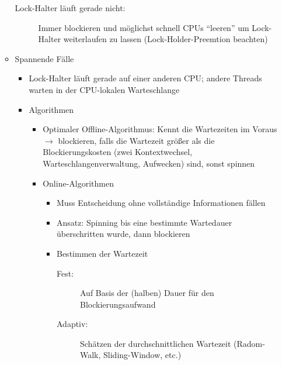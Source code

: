 \begin{itemize}
\begin{itemize}
\begin{description}
			\item[Lock-Halter läuft gerade nicht:] Immer blockieren und möglichst schnell CPUs "`leeren"' um Lock-Halter weiterlaufen zu lassen (Lock-Holder-Preemtion beachten)
		\end{description}
		\item Spannende Fälle
		\begin{itemize}
			\item Lock-Halter läuft gerade auf einer anderen CPU; andere Threads warten in der CPU-lokalen Warteschlange
			\item Algorithmen
			\begin{itemize}
				\item Optimaler Offline-Algorithmus: Kennt die Wartezeiten im Voraus \(\rightarrow\) blockieren, falls die Wartezeit größer als die Blockierungskosten (zwei Kontextwechsel, Warteschlangenverwaltung, Aufwecken) sind, sonst spinnen
				\item Online-Algorithmen
				\begin{itemize}
					\item Muss Entscheidung ohne vollständige Informationen fällen
					\item Ansatz: Spinning bis eine bestimmte Wartedauer überschritten wurde, dann blockieren
					\item Bestimmen der Wartezeit
					\begin{description}
						\item[Fest:] Auf Basis der (halben) Dauer für den Blockierungsaufwand
						\item[Adaptiv:] Schätzen der durchschnittlichen Wartezeit (Radom-Walk, Sliding-Window, etc.)
					\end{description}
				\end{itemize}
			\end{itemize}
		\end{itemize}
	\end{itemize}
\end{itemize}

